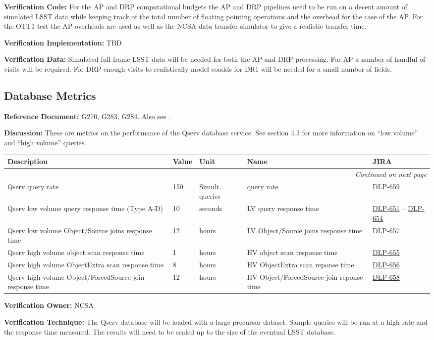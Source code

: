 \documentclass[DM,lsstdraft,toc]{lsstdoc}
\makeatletter
\newcommand{\jira}[1]{\href{https://jira.lsstcorp.org/browse/#1}{#1}}
\newenvironment{metric}[0]{%
\setlength\LTleft{0pt}
\setlength\LTright{\fill}
\begin{longtable}[]{@{}p{0.4\textwidth}lp{0.75in}p{1.3in}p{0.75in}@{}}

\hline \textbf{Description} & \textbf{Value} & \textbf{Unit} & \textbf{Name} & \textbf{JIRA} \\ \hline
\endhead

\hline \multicolumn{5}{r}{\emph{Continued on next page}} \\
\endfoot

\hline\hline
\endlastfoot
}{%
\hline
\end{longtable}
}
\makeatother
\begin{document}
\textbf{Verification Code:} For the AP and DRP computational budgets the
AP and DRP pipelines need to be run on a decent amount of simulated LSST
data while keeping track of the total number of floating pointing
operations and the overhead for the case of the AP. For the OTT1 test
the AP overheads are used as well as the NCSA data transfer simulator to
give a realistic transfer time.

\textbf{Verification Implementation:} TBD

\textbf{Verification Data:} Simulated full-frame LSST data will be
needed for both the AP and DRP processing. For AP a number of handful of
visits will be required. For DRP enough visits to realistically model
coadds for DR1 will be needed for a small number of fields.

\subsection{Database Metrics}\label{database-metrics}

\textbf{Reference Document:} \textbar{}G270, G283, G284. Also see
.

\textbf{Discussion:} These are metrics on the performance of the Qserv
database service. See  section 4.3 for more information on ``low
volume'' and ``high volume'' queries.

\begin{metric}
Qserv query rate & 150 & Simult. queries & query rate &
\jira{DLP-659}\tabularnewline
Qserv low volume query response time (Type A-D) & 10 & seconds & LV
query response time & \jira{DLP-651} -- \jira{DLP-654}\tabularnewline
Qserv low volume Object/Source joins response time & 12 & hours & LV
Object/Source joins response time & \jira{DLP-657}\tabularnewline
Qserv high volume object scan response time & 1 & hours & HV object scan
response time & \jira{DLP-655}\tabularnewline
Qserv high volume ObjectExtra scan response time & 8 & hours & HV
ObjectExtra scan reponse time & \jira{DLP-656}\tabularnewline
Qserv high volume Object/ForcedSource join response time & 12 & hours &
HV Object/ForcedSource join reponse time & \jira{DLP-658}\tabularnewline
\end{metric}

\textbf{Verification Owner:} NCSA

\textbf{Verification Technique:} The Qserv database will be loaded with
a large precursor dataset. Sample queries will be run at a high rate and
the response time measured. The results will need to be scaled up to the
size of the eventual LSST database.
\end{document}
